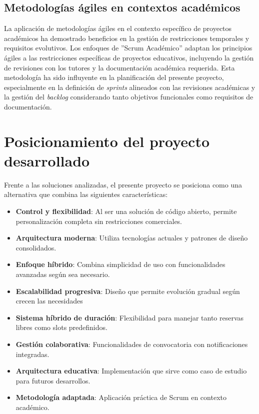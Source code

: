 \subsection{Metodologías ágiles en contextos académicos}\label{metodologias-agiles-contextos-academicos}
La aplicación de metodologías ágiles en el contexto específico de proyectos académicos ha demostrado beneficios en la gestión de restricciones temporales y requisitos evolutivos. Los enfoques de ''Scrum Académico'' adaptan los principios ágiles a las restricciones específicas de proyectos educativos, incluyendo la gestión de revisiones con los tutores y la documentación académica requerida.
Esta metodología ha sido influyente en la planificación del presente proyecto, especialmente en la definición de \emph{sprints} alineados con las revisiones académicas y la gestión del \emph{backlog} considerando tanto objetivos funcionales como requisitos de documentación.

\section{Posicionamiento del proyecto desarrollado}\label{posicionamiento-proyecto-desarrollado}
Frente a las soluciones analizadas, el presente proyecto se posiciona como una alternativa que combina las siguientes características:

\begin{itemize}
\tightlist
\item
\textbf{Control y flexibilidad}: Al ser una solución de código abierto, permite personalización completa sin restricciones comerciales.
\item
\textbf{Arquitectura moderna}: Utiliza tecnologías actuales y patrones de diseño consolidados.
\item
\textbf{Enfoque híbrido}: Combina simplicidad de uso con funcionalidades avanzadas según sea necesario.
\item
\textbf{Escalabilidad progresiva}: Diseño que permite evolución gradual según crecen las necesidades
\item
\textbf{Sistema híbrido de duración}: Flexibilidad para manejar tanto reservas libres como slots predefinidos.
\item
\textbf{Gestión colaborativa}: Funcionalidades de convocatoria con notificaciones integradas.
\item
\textbf{Arquitectura educativa}: Implementación que sirve como caso de estudio para futuros desarrollos.
\item
\textbf{Metodología adaptada}: Aplicación práctica de Scrum en contexto académico.
\end{itemize}

